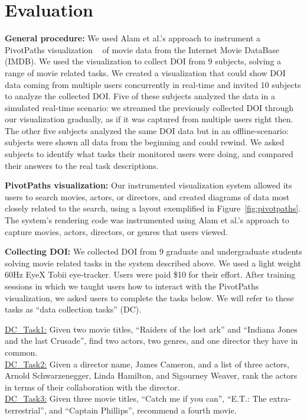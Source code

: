 \section{Evaluation}
\label{sec:Evaluation}

\textbf{General procedure:} We used Alam et al.'s approach to instrument a PivotPaths visualization ~\cite{dork2012pivotpaths} of movie data from the Internet Movie DataBase (IMDB). We used the visualization to collect DOI from 9 subjects, solving a range of movie related tasks. We created a visualization that could show DOI data coming from multiple users concurrently in real-time and invited 10 subjects to analyze the collected DOI. Five of these subjects analyzed the data in a simulated real-time scenario: we streamed the previously collected DOI through our visualization gradually, as if it was captured from multiple users right then. The other five subjects analyzed the same DOI data but in an offline-scenario: subjects were shown all data from the beginning and could rewind. We asked subjects to identify what tasks their monitored users were doing, and compared their answers to the real task descriptions.

\textbf{PivotPaths visualization:} Our instrumented visualization system allowed its users to search movies, actors, or directors, and created diagrams of data most closely related to the search, using a layout exemplified in Figure~\ref{fig:pivotpaths}. The system's rendering code was instrumented using Alam et al.'s approach to capture movies, actors, directors, or genres that users viewed.

\textbf{Collecting DOI:} We collected DOI from 9 graduate and undergraduate students solving movie related tasks in the system described above. We used a light weight 60Hz EyeX Tobii eye-tracker. Users were paid \$10 for their effort. After training sessions in which we taught users how to interact with the PivotPaths visualization, we asked users to complete the tasks below. We will refer to these tasks as ``data collection tasks'' (DC).

\noindent
\underline{DC\_Task1:} Given two movie titles, ``Raiders of the lost ark'' and ``Indiana Jones and the last Crusade'', find two actors, two genres, and one director they have in common.\\
\underline{DC\_Task2:} Given a director name, James Cameron, and a list of three actors, Arnold Schwarzenegger, Linda Hamilton, and Sigourney Weaver, rank the actors in terms of their collaboration with the director. \\
\underline{DC\_Task3:} Given three movie titles, ``Catch me if you can'', ``E.T.: The extra-terrestrial'', and ``Captain Phillips'', recommend a fourth movie.
 
